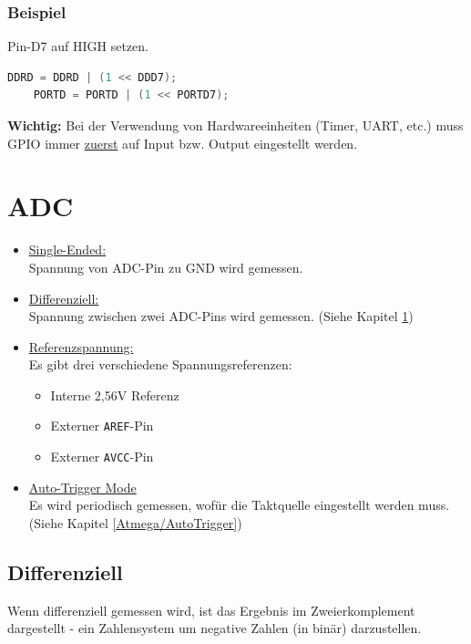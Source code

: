 \subsubsection*{Beispiel}
Pin-D7 auf HIGH setzen.
\begin{lstlisting}[language=C]
    DDRD = DDRD | (1 << DDD7);
    PORTD = PORTD | (1 << PORTD7);
\end{lstlisting}

\vspace{1cm}

\textbf{Wichtig:} Bei der Verwendung von Hardwareeinheiten (Timer, UART, etc.) muss GPIO immer \underline{zuerst} auf Input bzw. Output eingestellt werden.

\newpage

\section{ADC}
\begin{itemize}
    \item \underline{Single-Ended:} \\
    Spannung von ADC-Pin zu GND wird gemessen.
    \item \underline{Differenziell:} \\
    Spannung zwischen zwei ADC-Pins wird gemessen. (Siehe Kapitel \ref{})
    \item \underline{Referenzspannung:} \\
    Es gibt drei verschiedene Spannungsreferenzen:
    \begin{itemize}
        \item Interne 2,56V Referenz
        \item Externer \verb|AREF|-Pin
        \item Externer \verb|AVCC|-Pin
    \end{itemize}
    \item \underline{Auto-Trigger Mode} \\
    Es wird periodisch gemessen, wofür die Taktquelle eingestellt werden muss. (Siehe Kapitel \ref{Atmega/AutoTrigger})
\end{itemize}

\subsection{Differenziell} \label{Atmega/Differenziell}
Wenn differenziell gemessen wird, ist das Ergebnis im Zweierkomplement dargestellt - ein Zahlensystem um negative Zahlen (in binär) darzustellen.
